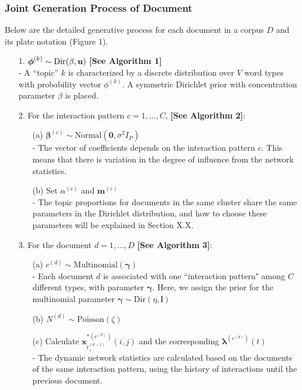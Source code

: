\documentclass[a4paper]{article}
\begin{document}
\subsubsection{Joint Generation Process of Document}
 Below are the detailed generative process for each document in a corpus $D$ and its plate notation (Figure 1).
\begin{itemize}
	\item[1.] {$\boldsymbol{\phi}^{(k)} \sim \mbox{Dir}(\beta, \bf u)$} \textbf{[See Algorithm 1]}\\
	- A “topic” $k$ is characterized by a discrete distribution over $V$ word types with probability vector $\phi^{(k)}$. A symmetric Dirichlet prior with concentration parameter $\beta$ is placed.
	\item[2.] For the interaction pattern $c=1,...,C$,  \textbf{[See Algorithm 2]}: 
		\begin{itemize}
			\item [(a)] $\boldsymbol{\beta}^{(c)}\sim \mbox{Normal}(\textbf{0}, \sigma^2I_P)$ \\
			- The vector of coefficients depends on the interaction pattern $c$. This means that there is variation in the degree of influence from the network statistics.
			\item [(b)]  Set $\alpha^{(c)}$ and $\boldsymbol{m}^{(c)}$\\
			- The topic proportions for documents in the same cluster share the same parameters in the Dirichlet distribution, and how to choose these parameters will be explained in Section X.X.
		\end{itemize}
	\item[3.] For the document $d=1,...,D$ \textbf{[See Algorithm 3]}:
	\begin{itemize}
				\item[(a)] $c^{(d)}\sim \mbox{Multinomial}(\boldsymbol{\gamma})$\\
				- Each document $d$ is associated with one ``interaction pattern" among $C$ different types, with parameter $\boldsymbol{\gamma}$. Here, we assign the prior for the multinomial parameter $\boldsymbol{\gamma} \sim \mbox{Dir}({\eta}, \boldsymbol{l})$
				\item[(b)]  $N^{(d)} \sim \mbox{Poisson}(\zeta)$
				\item[(c)] Calculate $\boldsymbol{x}^{*(c^{(d)})}_{t_+^{(d-1)}}(i, j)$ and the corresponding $\boldsymbol{\lambda}^{(c^{(d)})}(t)$\\
			- The dynamic network statistics are calculated based on the documents of the same interaction pattern, using the history of interactions until the previous document.

\end{itemize}
\end{itemize}
\end{document}
